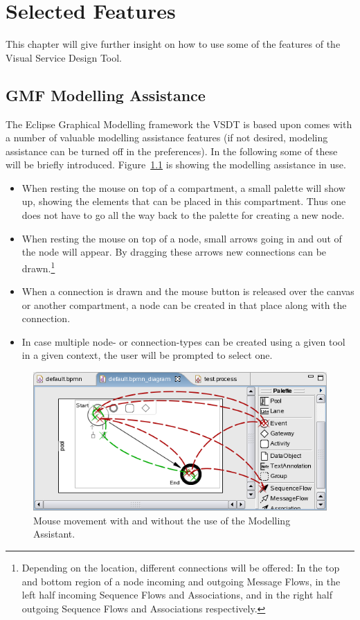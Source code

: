 \chapter{Selected Features}
\label{sec:user_features}

This chapter will give further insight on how to use some of the features of the Visual Service
Design Tool.


\section{GMF Modelling Assistance}
\label{sec:user_features_assistance}

The Eclipse Graphical Modelling framework the VSDT is based upon comes with a number of valuable
modelling assistance features (if not desired, modeling assistance can be turned off in the
preferences). In the following some of these will be briefly introduced. Figure~\ref{fig:modAss} is
showing the modelling assistance in use.

\begin{itemize}
	\item When resting the mouse on top of a compartment, a small palette will show up, showing the
	elements that can be placed in this compartment. Thus one does not have to go all the way back
	to the palette for creating a new node.
	\item When resting the mouse on top of a node, small arrows going in and out of the node will
	appear. By dragging these arrows new connections can be drawn.\footnote{Depending on the
	location, different connections will be offered: In the top and bottom region of a node incoming
	and outgoing Message Flows, in the left half incoming Sequence Flows and Associations, and in
	the right half outgoing Sequence Flows and Associations respectively.}
	\item When a connection is drawn and the mouse button is released over the canvas or another
	compartment, a node can be created in that place along with the connection.
	\item In case multiple node- or connection-types can be created using a given tool in a given
	context, the user will be prompted to select one.
\end{itemize}

\begin{figure}[ht]
	\centering
	\includegraphics[width=.5\textwidth]{figures/features/modellingAssistant.png}
	\caption{Mouse movement with and without the use of the Modelling Assistant.}
	\label{fig:modAss}
\end{figure}


